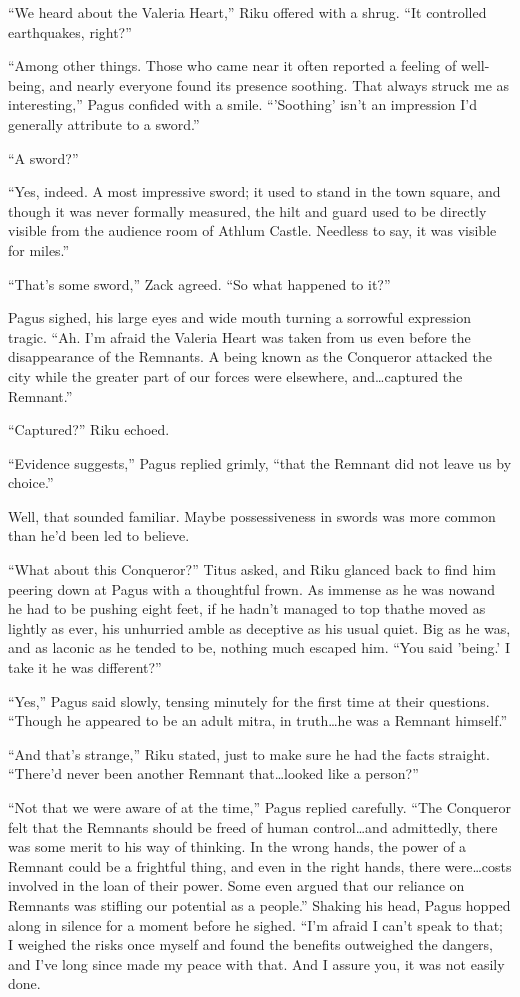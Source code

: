 ``We heard about the Valeria Heart,'' Riku offered with a shrug. ``It controlled earthquakes, right?''

``Among other things. Those who came near it often reported a feeling of well-being, and nearly everyone found its presence soothing. That always struck me as interesting,'' Pagus confided with a smile. ``'Soothing' isn't an impression I'd generally attribute to a sword.''

``A sword?''

``Yes, indeed. A most impressive sword; it used to stand in the town square, and though it was never formally measured, the hilt and guard used to be directly visible from the audience room of Athlum Castle. Needless to say, it was visible for miles.''

``That's some sword,'' Zack agreed. ``So what happened to it?''

Pagus sighed, his large eyes and wide mouth turning a sorrowful expression tragic. ``Ah. I'm afraid the Valeria Heart was taken from us even before the disappearance of the Remnants. A being known as the Conqueror attacked the city while the greater part of our forces were elsewhere, and\ldots captured the Remnant.''

``Captured?'' Riku echoed.

``Evidence suggests,'' Pagus replied grimly, ``that the Remnant did not leave us by choice.''

Well, that sounded familiar. Maybe possessiveness in swords was more common than he'd been led to believe.

``What about this Conqueror?'' Titus asked, and Riku glanced back to find him peering down at Pagus with a thoughtful frown. As immense as he was now\textemdash and he had to be pushing eight feet, if he hadn't managed to top that\textemdash he moved as lightly as ever, his unhurried amble as deceptive as his usual quiet. Big as he was, and as laconic as he tended to be, nothing much escaped him. ``You said 'being.' I take it he was different?''

``Yes,'' Pagus said slowly, tensing minutely for the first time at their questions. ``Though he appeared to be an adult mitra, in truth\ldots he was a Remnant himself.''

``And that's strange,'' Riku stated, just to make sure he had the facts straight. ``There'd never been another Remnant that\ldots looked like a person?''

``Not that we were aware of at the time,'' Pagus replied carefully. ``The Conqueror felt that the Remnants should be freed of human control\ldots and admittedly, there was some merit to his way of thinking. In the wrong hands, the power of a Remnant could be a frightful thing, and even in the right hands, there were\ldots costs involved in the loan of their power. Some even argued that our reliance on Remnants was stifling our potential as a people.'' Shaking his head, Pagus hopped along in silence for a moment before he sighed. ``I'm afraid I can't speak to that; I weighed the risks once myself and found the benefits outweighed the dangers, and I've long since made my peace with that. And I assure you, it was not easily done.

